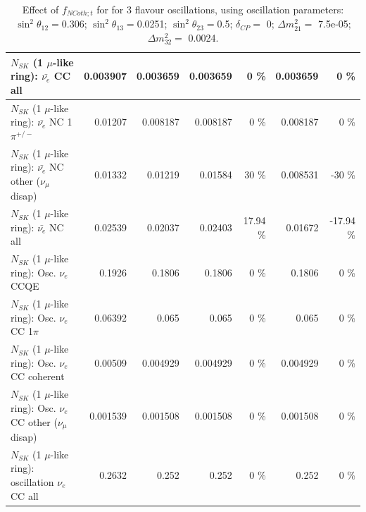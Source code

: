 \begin{table}
\begin{tabular}{| l | r | r | r  r | r  r |}
                            $N_{SK}$ (1 $\mu$-like ring): $\bar{\nu_{e}}$ CC all &        0.003907 &        0.003659 &        0.003659 &        0 \%  &        0.003659 &        0 \%  \\ 
\hline
                     $N_{SK}$ (1 $\mu$-like ring): $\bar{\nu_e}$ NC 1$\pi^{+/-}$ &         0.01207 &        0.008187 &        0.008187 &        0 \%  &        0.008187 &        0 \%  \\ 
          $N_{SK}$ (1 $\mu$-like ring): $\bar{\nu_e}$ NC other ($\nu_\mu$ disap) &         0.01332 &         0.01219 &         0.01584 &       30 \%  &        0.008531 &      -30 \%  \\ 
                            $N_{SK}$ (1 $\mu$-like ring): $\bar{\nu_{e}}$ NC all &         0.02539 &         0.02037 &         0.02403 &    17.94 \%  &         0.01672 &   -17.94 \%  \\ 
\hline
\hline
\hline
                                 $N_{SK}$ (1 $\mu$-like ring): Osc. $\nu_e$ CCQE &          0.1926 &          0.1806 &          0.1806 &        0 \%  &          0.1806 &        0 \%  \\ 
                            $N_{SK}$ (1 $\mu$-like ring): Osc. $\nu_e$ CC 1$\pi$ &         0.06392 &           0.065 &           0.065 &        0 \%  &           0.065 &        0 \%  \\ 
                          $N_{SK}$ (1 $\mu$-like ring): Osc. $\nu_e$ CC coherent &         0.00509 &        0.004929 &        0.004929 &        0 \%  &        0.004929 &        0 \%  \\ 
           $N_{SK}$ (1 $\mu$-like ring): Osc. $\nu_e$ CC other ($\nu_\mu$ disap) &        0.001539 &        0.001508 &        0.001508 &        0 \%  &        0.001508 &        0 \%  \\ 
                        $N_{SK}$ (1 $\mu$-like ring): oscillation $\nu_e$ CC all &          0.2632 &           0.252 &           0.252 &        0 \%  &           0.252 &        0 \%  \\ 
\hline
\hline
\end{tabular}
\caption{ Effect of $f_{NCoth; t}$ for for 3 flavour oscillations, using oscillation parameters:  $\sin^2\theta_{12} = $0.306; $\sin^2\theta_{13} = $0.0251; $\sin^2\theta_{23} = $0.5; $\delta_{CP} = $        0; $\Delta m^2_{21} = $    7.5e-05; $\Delta m^2_{32} = $    0.0024. }
\label{tab:num_xsec_norm_ncoth_1RmuT_3f_osc_t13:0.0251}
\end{table}
\clearpage
